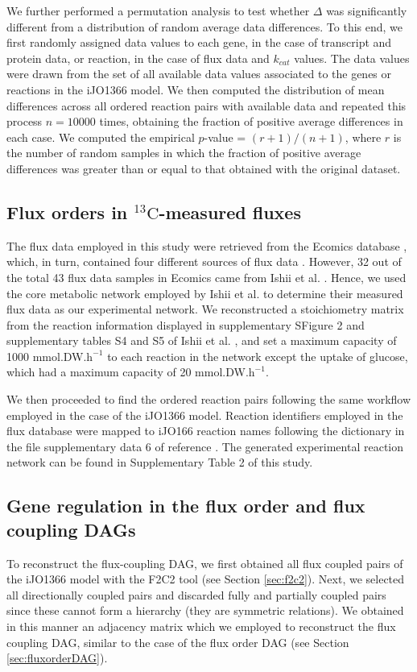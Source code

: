 \documentclass[12pt]{article}
\begin{document}
We further performed a permutation analysis to test whether $\Delta$ was significantly different from a distribution of random average data differences. To this end, we first randomly assigned data values to each gene, in the case of transcript and protein data, or reaction, in the case of flux data and $k_{cat}$ values. The data values were drawn from the set of all available data values associated to the genes or reactions in the iJO1366 model. We then computed the distribution of mean differences across all ordered reaction pairs with available data and repeated this process $n = 10000$ times, obtaining the fraction of positive average differences in each case. We computed the empirical $p$-value = $(r + 1) / (n + 1)$, where $r$ is the number of random samples in which the fraction of positive average differences was greater than or equal to that obtained with the original dataset.

\subsection{Flux orders in ${}^{13}\mathrm{C}$-measured fluxes}
\label{subsection:experimentalNetwork}
The flux data employed in this study were retrieved from the Ecomics database \cite{Kim2016}, which, in turn, contained four different sources of flux data \cite{Schaub2008,Crown2015,Toya2012,Ishii2007}. However, 32 out of the total 43 flux data samples in Ecomics came from Ishii et al. \cite{Ishii2007}. Hence, we used the core metabolic network employed by Ishii et al. \cite{Ishii2007} to determine their measured flux data as our experimental network. We reconstructed a stoichiometry matrix from the reaction information displayed in supplementary SFigure 2 and supplementary tables S4 and S5 of Ishii et al. \cite{Ishii2007}, and set a maximum capacity of 1000 mmol.DW.$\mathrm{h}^{-1}$ to each reaction in the network except the uptake of glucose, which had a maximum capacity of 20 mmol.DW.$\mathrm{h}^{-1}$.

We then proceeded to find the ordered reaction pairs following the same workflow employed in the case of the iJO1366 model. Reaction identifiers employed in the flux database were mapped to iJO166 reaction names following the dictionary in the file supplementary data 6 of reference \cite{Kim2016}. The generated experimental reaction network can be found in Supplementary Table 2 of this study.

\subsection{Gene regulation in the flux order and flux coupling DAGs}
\label{subsection:GRNanalysis}
To reconstruct the flux-coupling DAG, we first obtained all flux coupled pairs of the iJO1366 model with the F2C2 tool (see Section \ref{sec:f2c2}). Next, we selected all directionally coupled pairs and discarded fully and partially coupled pairs since these cannot form a hierarchy (they are symmetric relations). We obtained in this manner an adjacency matrix which we employed to reconstruct the flux coupling DAG, similar to the case of the flux order DAG (see Section \ref{sec:fluxorderDAG}).
\end{document}
